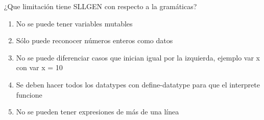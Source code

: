 {
  
  ¿Que limitación tiene SLLGEN con respecto a la gramáticas?
  \begin{enumerate}

\item No se puede tener variables mutables
\item Sólo puede reconocer números enteros como datos
\item No se puede diferenciar casos que inician igual por la izquierda, ejemplo var x  con var x = 10 %
\item Se deben hacer todos los datatypes con define-datatype para que el interprete funcione
\item No se pueden tener expresiones de más de una línea
  \end{enumerate}

}

